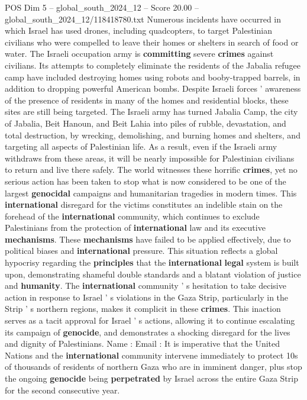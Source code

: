 \begin{textsample}{POS Dim 5 – global\_south\_2024\_12 – Score 20.00 – global\_south\_2024\_12/118418780.txt}
Numerous incidents have occurred in which Israel has used drones, including quadcopters, to target Palestinian civilians who were compelled to leave their homes or shelters in search of food or water.
The Israeli occupation army is \textbf{committing} severe \textbf{crimes} against civilians.
Its attempts to completely eliminate the residents of the Jabalia refugee camp have included destroying homes using robots and booby-trapped barrels, in addition to dropping powerful American bombs.
Despite Israeli forces ' awareness of the presence of residents in many of the homes and residential blocks, these sites are still being targeted.
The Israeli army has turned Jabalia Camp, the city of Jabalia, Beit Hanoun, and Beit Lahia into piles of rubble, devastation, and total destruction, by wrecking, demolishing, and burning homes and shelters, and targeting all aspects of Palestinian life.
As a result, even if the Israeli army withdraws from these areas, it will be nearly impossible for Palestinian civilians to return and live there safely.
The world witnesses these horrific \textbf{crimes}, yet no serious action has been taken to stop what is now considered to be one of the largest \textbf{genocidal} campaigns and humanitarian tragedies in modern times.
This \textbf{international} disregard for the victims constitutes an indelible stain on the forehead of the \textbf{international} community, which continues to exclude Palestinians from the protection of \textbf{international} law and its executive \textbf{mechanisms}.
These \textbf{mechanisms} have failed to be applied effectively, due to political biases and \textbf{international} pressure.
This situation reflects a global hypocrisy regarding the \textbf{principles} that the \textbf{international} \textbf{legal} system is built upon, demonstrating shameful double standards and a blatant violation of justice and \textbf{humanity}.
The \textbf{international} community ' s hesitation to take decisive action in response to Israel ' s violations in the Gaza Strip, particularly in the Strip ' s northern regions, makes it complicit in these \textbf{crimes}.
This inaction serves as a tacit approval for Israel ' s actions, allowing it to continue escalating its campaign of \textbf{genocide}, and demonstrates a shocking disregard for the lives and dignity of Palestinians.
Name : Email : It is imperative that the United Nations and the \textbf{international} community intervene immediately to protect 10s of thousands of residents of northern Gaza who are in imminent danger, plus stop the ongoing \textbf{genocide} being \textbf{perpetrated} by Israel across the entire Gaza Strip for the second consecutive year.

\end{textsample}
